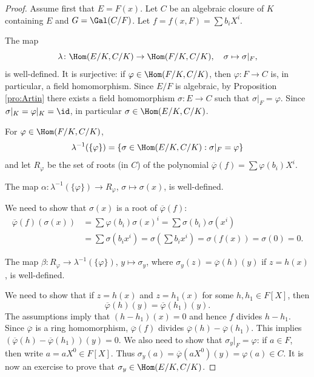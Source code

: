  \begin{proof}
    Assume first that $E=F(x)$. 
    Let $C$ be an algebraic closure of $K$ containing $E$ 
    and $G=\Gal(C/F)$. Let $f=f(x,F)=\sum b_iX^i$.
    
    The map
    \[
    \lambda\colon \Hom(E/K,C/K)\to\Hom(F/K,C/K),\quad
    \sigma\mapsto\sigma|_F,
    \]
    is well-defined. 
    It is surjective: 
    if $\varphi\in\Hom(F/K,C/K)$, then $\varphi\colon F\to C$ is, 
    in particular, a field homomorphism. Since $E/F$ is algebraic, by Proposition \ref{pro:Artin} 
    there exists a field homomorphism 
    $\sigma\colon E\to C$ such that $\sigma|_F=\varphi$. Since $\sigma|_K=\varphi|_K=\id$, in particular 
    $\sigma\in\Hom(E/K,C/K)$. 
    
    For $\varphi\in\Hom(F/K,C/K)$,  
    \[
    \lambda^{-1}(\{\varphi\})=\{\sigma\in\Hom(E/K,C/K):\sigma|_F=\varphi\}
    \]
    and let $R_\varphi$ be the set of roots (in $C$) of the polynomial $\overline{\varphi}(f)=\sum\varphi(b_i)X^i$. 
    
    \begin{claim}
        The map $\alpha\colon \lambda^{-1}(\{\varphi\})\to R_{\varphi}$, $\sigma\mapsto\sigma(x)$, is well-defined. 
    \end{claim}
    
    We need to show that $\sigma(x)$ is a root of $\overline{\varphi}(f)$:
    \begin{align*}
    \overline{\varphi}(f)(\sigma(x))&=\sum \varphi(b_i)\sigma(x)^i
    =\sum\sigma(b_i)\sigma(x^i)\\
    &=\sum\sigma(b_ix^i)=\sigma\left(\sum b_ix^i\right)=\sigma(f(x))=\sigma(0)=0.
    \end{align*}
    
    \begin{claim}
    The map $\beta\colon R_{\varphi}\to \lambda^{-1}(\{\varphi\})$, $y\mapsto\sigma_y$, 
    where $\sigma_y(z)=\overline{\varphi}(h)(y)$
    if $z=h(x)$, is well-defined. 
    \end{claim}
    
    We need to show that if $z=h(x)$ and 
    $z=h_1(x)$ for some $h,h_1\in F[X]$, then 
    \[
    \overline{\varphi}(h)(y)=\overline{\varphi}(h_1)(y).
    \]
    The assumptions imply that 
    $(h-h_1)(x)=0$ and hence $f$ divides $h-h_1$. Since
    $\overline{\varphi}$ is a ring homomorphism, 
    $\overline{\varphi}(f)$ divides $\overline{\varphi}(h)-\overline{\varphi}(h_1)$. 
    This implies $(\overline{\varphi}(h)-\overline{\varphi}(h_1))(y)=0$. We also need to show that 
    $\sigma_y|_F=\varphi$: if $a\in F$, then 
    write $a=aX^0\in F[X]$. Thus 
    $\sigma_y(a)=\overline{\varphi}(aX^0)(y)=\varphi(a)\in C$. 
    It is now an exercise to prove that $\sigma_y\in\Hom(E/K,C/K)$. 
    

\end{proof}
